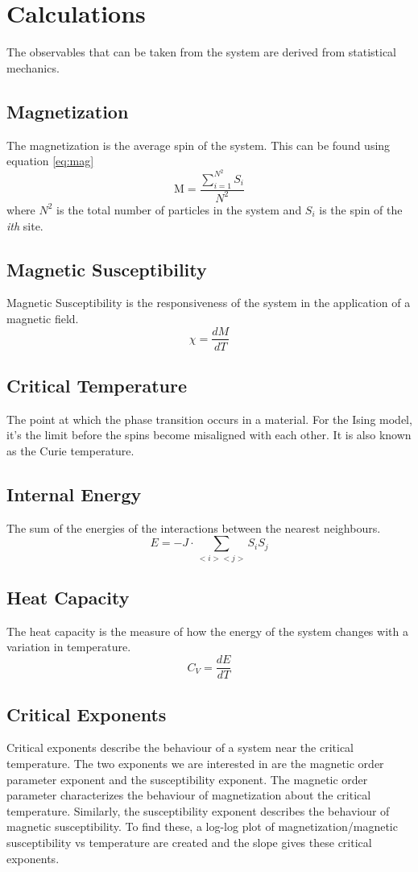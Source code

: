 \documentclass[letterpaper,12pt]{article}
\numberwithin{equation}{subsection}
\begin{document}
\section{Calculations}
The observables that can be taken from the system are derived from statistical mechanics.
\subsection{Magnetization}
The magnetization is the average spin of the system. This can be found using equation \eqref{eq:mag}
\begin{equation}
\text{M} = \frac{\sum \limits_{i = 1} ^{N^2} S_i}{N^2}
\end{equation}
where $N^2$ is the total number of particles in the system and $S_i$ is the spin of the \textit{ith} site.
\subsection{Magnetic Susceptibility}
Magnetic Susceptibility is the responsiveness of the system in the application of a magnetic field.
\begin{equation}
\chi = \dfrac{dM}{dT}
\end{equation}
\subsection{Critical Temperature}
The point at which the phase transition occurs in a material. For the Ising model, it's the limit before the spins become misaligned with each other. It is also known as the Curie temperature.
\subsection{Internal Energy}
The sum of the energies of the interactions between the nearest neighbours.
\begin{equation}
E = - J \cdot \sum \limits_{<i><j>} S_i S_j
\end{equation}
\subsection{Heat Capacity}
The heat capacity is the measure of how the energy of the system changes with a variation in temperature.
\begin{equation}
C_V = \dfrac{dE}{dT}
\end{equation}
\subsection{Critical Exponents}
Critical exponents describe the behaviour of a system near the critical temperature. The two exponents we are interested in are the magnetic order parameter exponent and the susceptibility exponent. The magnetic order parameter characterizes the behaviour of magnetization about the critical temperature. Similarly, the susceptibility exponent describes the behaviour of magnetic susceptibility. To find these, a log-log plot of magnetization/magnetic susceptibility vs temperature are created and the slope gives these critical exponents.
\newpage
\end{document}

